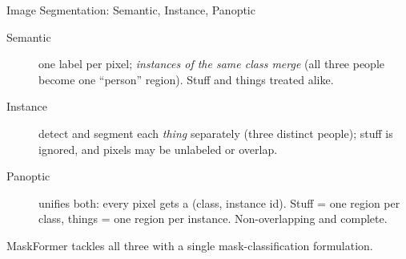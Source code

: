 \begin{frame}[fragile]{Image Segmentation: Semantic, Instance, Panoptic}
  \vspace{0.3em}
  \begin{description}
    \item[Semantic] one label per pixel; \emph{instances of the same class merge}
      (all three people become one ``person'' region). Stuff and things treated alike.
    \item[Instance] detect and segment each \emph{thing} separately (three distinct people);
      stuff is ignored, and pixels may be unlabeled or overlap.
    \item[Panoptic] unifies both: every pixel gets a (class, instance id). Stuff = one region
      per class, things = one region per instance. Non-overlapping and complete.
  \end{description}

  \vspace{0.2em}
  {\footnotesize MaskFormer tackles all three with a single mask-classification formulation.}
\end{frame}

